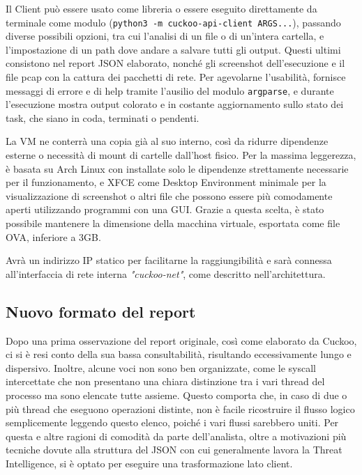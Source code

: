 Il Client può essere usato come libreria o essere eseguito direttamente da terminale come modulo (\texttt{python3 -m cuckoo-api-client ARGS...}), passando diverse possibili opzioni, tra cui l'analisi di un file o di un'intera cartella, e l'impostazione di un path dove andare a salvare tutti gli output.
Questi ultimi consistono nel report JSON elaborato, nonché gli screenshot dell'esecuzione e il file pcap con la cattura dei pacchetti di rete.
Per agevolarne l'usabilità, fornisce messaggi di errore e di help tramite l'ausilio del modulo \texttt{argparse}, e durante l'esecuzione mostra output colorato e in costante aggiornamento sullo stato dei task, che siano in coda, terminati o pendenti.

La VM ne conterrà una copia già al suo interno, così da ridurre dipendenze esterne o necessità di mount di cartelle dall'host fisico. Per la massima leggerezza, è basata su Arch Linux con installate solo le dipendenze strettamente necessarie per il funzionamento, e XFCE come Desktop Environment minimale per la visualizzazione di screenshot o altri file che possono essere più comodamente aperti utilizzando programmi con una GUI. Grazie a questa scelta, è stato possibile mantenere la dimensione della macchina virtuale, esportata come file OVA, inferiore a 3GB.

Avrà un indirizzo IP statico per facilitarne la raggiungibilità e sarà connessa all'interfaccia di rete interna \emph{"cuckoo-net"}, come descritto nell'architettura.

\subsection{Nuovo formato del report}
\label{sez:dynamic-report-new-format}
Dopo una prima osservazione del report originale, così come elaborato da Cuckoo, ci si è resi conto della sua bassa consultabilità, risultando eccessivamente lungo e dispersivo. Inoltre, alcune voci non sono ben organizzate, come le syscall intercettate che non presentano una chiara distinzione tra i vari thread del processo ma sono elencate tutte assieme. Questo comporta che, in caso di due o più thread che eseguono operazioni distinte, non è facile ricostruire il flusso logico semplicemente leggendo questo elenco, poiché i vari flussi sarebbero uniti.
Per questa e altre ragioni di comodità da parte dell'analista, oltre a motivazioni più tecniche dovute alla struttura del JSON con cui generalmente lavora la Threat Intelligence, si è optato per eseguire una trasformazione lato client.

